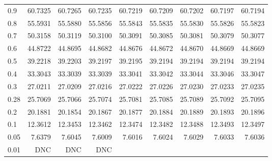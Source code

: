 \begin{landscape}
\begin{table}
\begin{center}
\begin{tabular}{l|rrrrrrrr}
0.9 &  60.7325 & 60.7265 & 60.7235 & 60.7219 & 60.7209 & 60.7202 & 60.7197 & 60.7194 \\ 
0.8 &  55.5931 & 55.5880 & 55.5856 & 55.5843 & 55.5835 & 55.5830 & 55.5826 & 55.5823 \\ 
0.7 &  50.3158 & 50.3119 & 50.3100 & 50.3091 & 50.3085 & 50.3081 & 50.3079 & 50.3077 \\ 
0.6 &  44.8722 & 44.8695 & 44.8682 & 44.8676 & 44.8672 & 44.8670 & 44.8669 & 44.8669 \\ 
0.5 &  39.2218 & 39.2203 & 39.2197 & 39.2195 & 39.2194 & 39.2194 & 39.2194 & 39.2194 \\ 
0.4 &  33.3043 & 33.3039 & 33.3039 & 33.3041 & 33.3042 & 33.3044 & 33.3046 & 33.3047 \\ 
0.3 &  27.0211 & 27.0209 & 27.0216 & 27.0222 & 27.0226 & 27.0230 & 27.0233 & 27.0235 \\ 
0.28 & 25.7069 & 25.7066 & 25.7074 & 25.7081 & 25.7085 & 25.7089 & 25.7092 & 25.7095 \\ 
0.2 &  20.1881 & 20.1854 & 20.1867 & 20.1877 & 20.1884 & 20.1889 & 20.1893 & 20.1896 \\ 
0.1 &  12.3612 & 12.3453 & 12.3462 & 12.3474 & 12.3482 & 12.3488 & 12.3493 & 12.3497 \\ 
0.05 &  7.6379 &  7.6045 &  7.6009 &  7.6016 &  7.6024 &  7.6029 &  7.6033 &  7.6036 \\ 
0.01 &     DNC &     DNC &     DNC & \\                                    
\hline \hline
\end{tabular}
\end{center}
\end{table}
\end{landscape}



